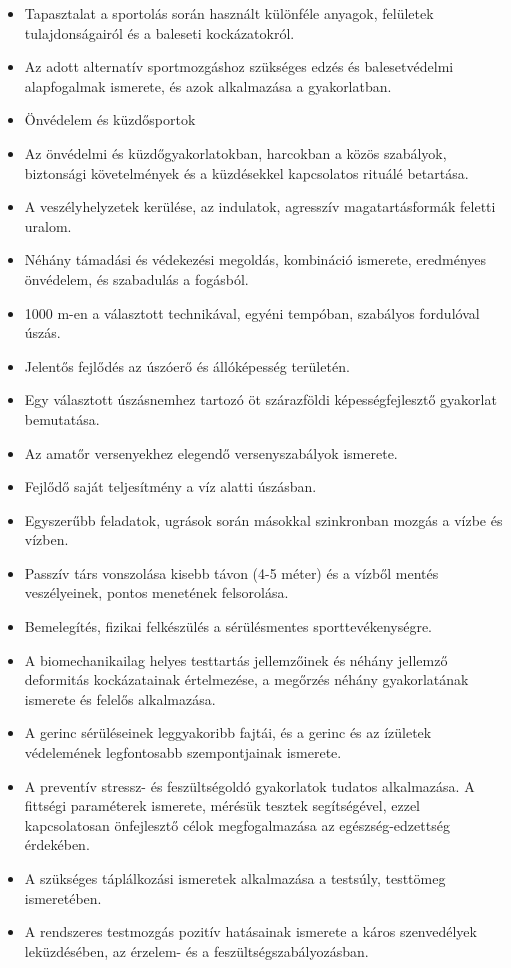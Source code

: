 \begin{itemize}
\item Tapasztalat a sportolás során használt különféle anyagok, felületek tulajdonságairól és a baleseti kockázatokról.
\item Az adott alternatív sportmozgáshoz szükséges edzés és balesetvédelmi alapfogalmak ismerete, és azok alkalmazása a gyakorlatban.
\item Önvédelem és küzdősportok
\item Az önvédelmi és küzdőgyakorlatokban, harcokban a közös szabályok, biztonsági követelmények és a küzdésekkel kapcsolatos rituálé betartása.
\item A veszélyhelyzetek kerülése, az indulatok, agresszív magatartásformák feletti uralom.
\item Néhány támadási és védekezési megoldás, kombináció ismerete, eredményes önvédelem, és szabadulás a fogásból.
\item 1000 m-en a választott technikával, egyéni tempóban, szabályos fordulóval úszás.
\item Jelentős fejlődés az úszóerő és állóképesség területén.
\item Egy választott úszásnemhez tartozó öt szárazföldi képességfejlesztő gyakorlat bemutatása.
\item Az amatőr versenyekhez elegendő versenyszabályok ismerete.
\item Fejlődő saját teljesítmény a víz alatti úszásban.
\item Egyszerűbb feladatok, ugrások során másokkal szinkronban mozgás a vízbe és vízben.
\item Passzív társ vonszolása kisebb távon (4-5 méter) és a vízből mentés veszélyeinek, pontos menetének felsorolása.
\item Bemelegítés, fizikai felkészülés a sérülésmentes sporttevékenységre.
\item A biomechanikailag helyes testtartás jellemzőinek és néhány jellemző deformitás kockázatainak értelmezése, a megőrzés néhány gyakorlatának ismerete és felelős alkalmazása.
\item A gerinc sérüléseinek leggyakoribb fajtái, és a gerinc és az ízületek védelemének legfontosabb szempontjainak ismerete.
\item A preventív stressz- és feszültségoldó gyakorlatok tudatos alkalmazása. A fittségi paraméterek ismerete, mérésük tesztek segítségével, ezzel kapcsolatosan önfejlesztő célok megfogalmazása az egészség-edzettség érdekében.
\item A szükséges táplálkozási ismeretek alkalmazása a testsúly, testtömeg ismeretében.
\item A rendszeres testmozgás pozitív hatásainak ismerete a káros szenvedélyek leküzdésében, az érzelem- és a feszültségszabályozásban.
\end{itemize}
